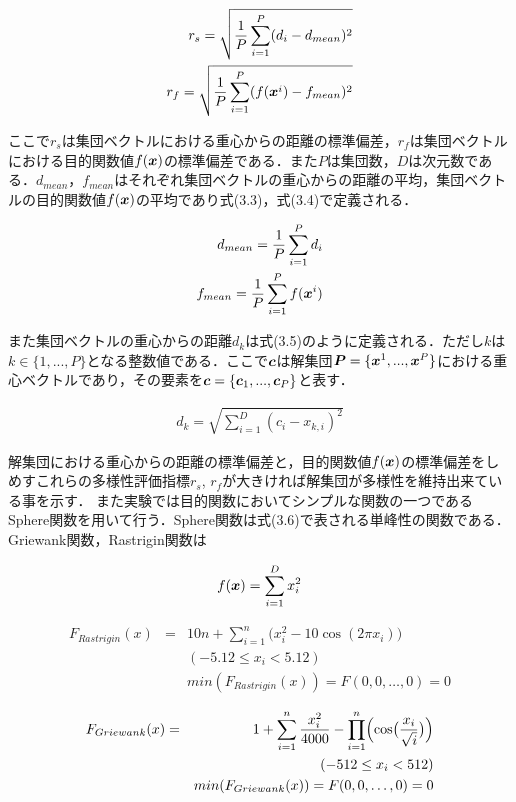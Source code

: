 \documentclass[a4paper,11pt,oneside,openany]{jsbook}
\def\vector#1{\mbox{\boldmath $#1$}}
\begin{document}
\begin{eqnarray}
r_{s} = \sqrt{\frac{1}{P}\sum_{i=1}^{P} (d_i - d_{mean})^2} \\
r_{f} = \sqrt{\frac{1}{P}\sum_{i=1}^{P} (f(\vector{x}^i) - f_{mean})^2}
\end{eqnarray}

ここで$r_s$は集団ベクトルにおける重心からの距離の標準偏差，$r_f$は集団ベクトルにおける目的関数値$f(\vector{x})$の標準偏差である．また$P$は集団数，$D$は次元数である．$d_{mean}$，$f_{mean}$はそれぞれ集団ベクトルの重心からの距離の平均，集団ベクトルの目的関数値$f(\vector{x})$の平均であり式(3.3)，式(3.4)で定義される．

\begin{eqnarray}
d_{mean} = \frac{1}{P}\sum_{i=1}^{P}d_i \\
f_{mean} = \frac{1}{P}\sum_{i=1}^{P}f(\vector{x}^i)
\end{eqnarray}

また集団ベクトルの重心からの距離$d_k$は式(3.5)のように定義される．ただし$k$は$k \in \{1, ..., P\}$となる整数値である．ここで$\vector{c}$は解集団$\vector{P} = \{ \vector{x}^{1}, ..., \vector{x}^{P} \}$における重心ベクトルであり，その要素を$\vector{c} = \{ \vector{c}_{1}, ..., \vector{c}_{P} \}$と表す．

\begin{eqnarray}
d_{k} = \sqrt{\sum_{i=1}^{D} (c_i - x_{k,i})^2}
\end{eqnarray}

解集団における重心からの距離の標準偏差と，目的関数値$f(\vector{x})$の標準偏差をしめすこれらの多様性評価指標$r_s$, $r_f$が大きければ解集団が多様性を維持出来ている事を示す．
また実験では目的関数においてシンプルな関数の一つであるSphere関数を用いて行う．Sphere関数は式(3.6)で表される単峰性の関数である．
Griewank関数，Rastrigin関数は

\begin{eqnarray}
  f(\vector{x}) = \sum_{i=1}^D x_i^2
\end{eqnarray}

\begin{eqnarray}
F_{Rastrigin}(x) &=& 10n+\sum_{i=1}^{n}\bigl( x_i^2-10\cos( 2\pi x_i) \bigr) \label{rastrigin} \\
& & (-5.12 \le x_i < 5.12) \nonumber \\ 
& & min(F_{Rastrigin}(x)) = F(0, 0, \ldots, 0) = 0 \nonumber 
\end{eqnarray}

\begin{eqnarray} F_{Griewank}(x) & = & 1+\sum_{i=1}^{n}\frac{x_i^2}{4000}-\prod_{i=1}^{n} \Bigl(\cos
\bigl(\frac{x_i}{\sqrt{i}} \bigr) \Bigr) \label{griewank} \\
& & (-512 \le x_i < 512) \nonumber \\
& & min(F_{Griewank}(x)) = F(0, 0, \ldots, 0) = 0 \nonumber
\end{eqnarray}
\end{document}
